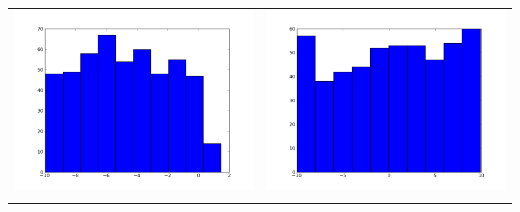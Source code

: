 \documentclass[12pt,a4paper,titlepage]{article}
\begin{document}
\newpage
\begin{table}[ht]
\centering
\begin{tabular}{cc}
\includegraphics[scale=0.2]{p1th1_1}&\includegraphics[scale=0.2]{p1th2_1.png}\\
\newline

\end{tabular}
\end{table}
\end{document}
